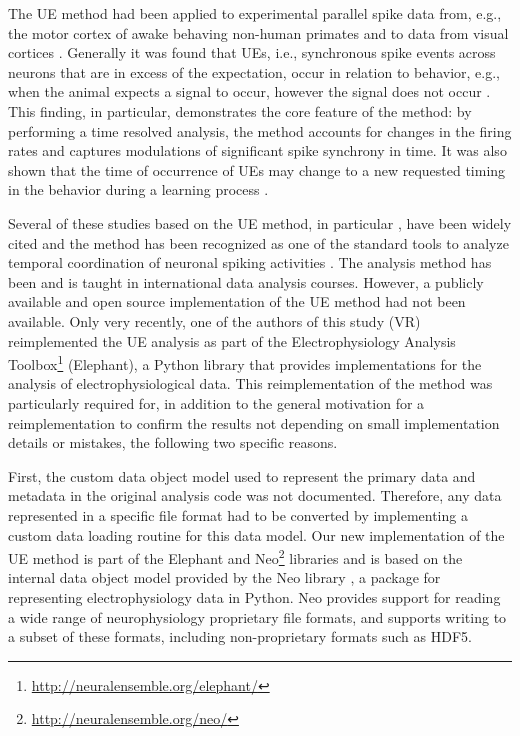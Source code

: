 \documentclass[10pt,a4paper,onecolumn]{article}
\begin{document}
The UE method had been applied to experimental parallel spike data from,
e.g., the motor cortex of awake behaving non-human primates
\autocites{Riehle97}{Gruen99}{Grammont99}{Riehle2000}{Gruen03b}{Kilavik09}{Denker10}{Denker11}
and to data from visual cortices \autocites{Maldonado08}{Ito11}.
Generally it was found that UEs, i.e., synchronous spike events across
neurons that are in excess of the expectation, occur in relation to
behavior, e.g., when the animal expects a signal to occur, however the
signal does not occur \autocite{Riehle97}. This finding, in particular,
demonstrates the core feature of the method: by performing a time
resolved analysis, the method accounts for changes in the firing rates
and captures modulations of significant spike synchrony in time. It was
also shown that the time of occurrence of UEs may change to a new
requested timing in the behavior during a learning process
\autocite{Kilavik09}.

Several of these studies based on the UE method, in particular
\autocite{Riehle97}, have been widely cited and the method has been
recognized as one of the standard tools to analyze temporal coordination
of neuronal spiking activities \autocites{Brown04_456}{Nakahara02}. The
analysis method has been and is taught in international data analysis
courses. However, a publicly available and open source implementation of
the UE method had not been available. Only very recently, one of the
authors of this study (VR) reimplemented the UE analysis as part of the
Electrophysiology Analysis Toolbox\footnote{\url{http://neuralensemble.org/elephant/}}
(Elephant), a Python library that provides implementations for the
analysis of electrophysiological data. This reimplementation of the
method was particularly required for, in addition to the general
motivation for a reimplementation to confirm the results not depending
on small implementation details or mistakes, the following two specific
reasons.

First, the custom data object model used to represent the primary data
and metadata in the original analysis code was not documented.
Therefore, any data represented in a specific file format had to be
converted by implementing a custom data loading routine for this data
model. Our new implementation of the UE method is part of the Elephant
and Neo\footnote{\url{http://neuralensemble.org/neo/}} libraries and is
based on the internal data object model provided by the Neo library
\autocite{Garcia14}, a package for representing electrophysiology data
in Python. Neo provides support for reading a wide range of
neurophysiology proprietary file formats, and supports writing to a
subset of these formats, including non-proprietary formats such as HDF5.
\end{document}
